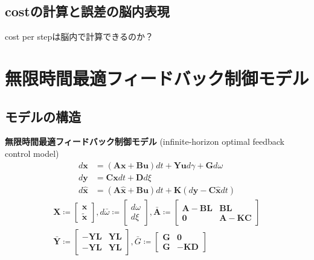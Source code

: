 \subsection{costの計算と誤差の脳内表現}
cost per stepは脳内で計算できるのか？
\section{無限時間最適フィードバック制御モデル}
\subsection{モデルの構造}
\textbf{無限時間最適フィードバック制御モデル} (infinite-horizon optimal feedback control model) \citep{Qian2013-zy}
\begin{align}
d \mathbf{x}&=(\mathbf{A} \mathbf{x}+\mathbf{B} \mathbf{u}) dt +\mathbf{Y} \mathbf{u} d \gamma+\mathbf{G} d \omega \\
d \mathbf{y}&=\mathbf{C} \mathbf{x} dt+\mathbf{D} d \xi\\
d \hat{\mathbf{x}}&=(\mathbf{A} \hat{\mathbf{x}}+\mathbf{B} \mathbf{u}) dt+\mathbf{K}(d\mathbf{y}-\mathbf{C} \hat{\mathbf{x}} dt)
\end{align}
\begin{align}
\mathbf{X}\coloneqq \begin{bmatrix}
\mathbf{x} \\
\tilde{\mathbf{x}}
\end{bmatrix}, d \bar{\omega} \coloneqq \begin{bmatrix}
d \omega \\
d \xi
\end{bmatrix}, \bar{\mathbf{A}} \coloneqq \begin{bmatrix}
\mathbf{A}-\mathbf{B} \mathbf{L} & \mathbf{B} \mathbf{L} \\
\mathbf{0} & \mathbf{A}-\mathbf{K} \mathbf{C}
\end{bmatrix}\\
\bar{\mathbf{Y}} \coloneqq \begin{bmatrix}
-\mathbf{Y} \mathbf{L} & \mathbf{Y} \mathbf{L} \\
-\mathbf{Y} \mathbf{L} & \mathbf{Y} \mathbf{L}
\end{bmatrix}, \bar{G} \coloneqq \begin{bmatrix}
\mathbf{G} & \mathbf{0} \\
\mathbf{G} & -\mathbf{K} \mathbf{D}
\end{bmatrix}
\end{align}
